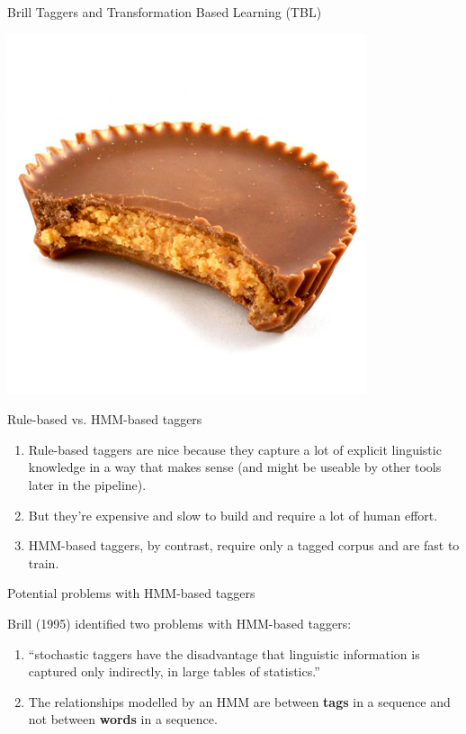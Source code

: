\documentclass[9pt,xcolor=pdftex,dvipsnames,table]{beamer}
\begin{document}
\begin{frame}{Brill Taggers and Transformation Based Learning (TBL)}
	\begin{center}
		\includegraphics[width=.6\paperwidth]{reeses}
	\end{center}
\end{frame}

\begin{frame}{Rule-based vs. HMM-based taggers}

	\begin{enumerate}
		\item Rule-based taggers are nice because they capture a lot of explicit linguistic knowledge in a way that makes sense (and might be useable by other tools later in the pipeline).
		\item But they're expensive and slow to build and require a lot of human effort.
		\item HMM-based taggers, by contrast, require only a tagged corpus and are fast to train.
	\end{enumerate}
\end{frame}

\begin{frame}{Potential problems with HMM-based taggers}

{\large Brill (1995) identified two problems with HMM-based taggers:}
\vspace{.5cm}
	\begin{enumerate}
		\item ``stochastic taggers have the disadvantage that linguistic information is captured only indirectly, in large tables of statistics.''
		\item The relationships modelled by an HMM are between \textbf{tags} in a sequence and not between \textbf{words} in a sequence.
	\end{enumerate}
\end{frame}
\end{document}
